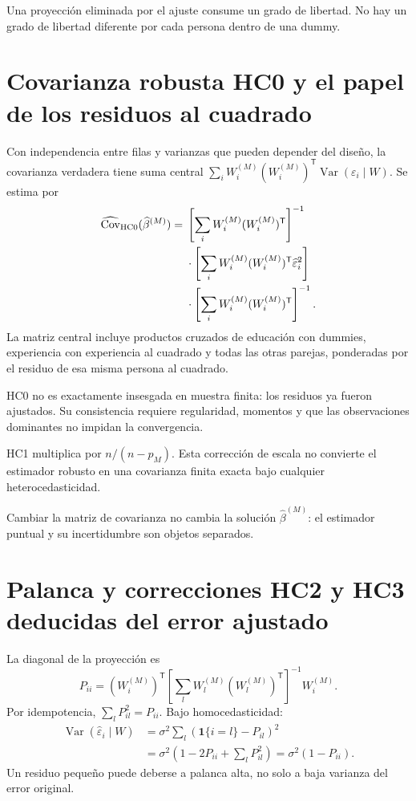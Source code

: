 \documentclass[11pt,a4paper]{article}
\DeclareMathOperator{\Var}{Var}
\DeclareMathOperator{\Cov}{Cov}
\begin{document}
Una proyección eliminada por el ajuste consume un grado de libertad. No hay un grado de libertad diferente por cada persona dentro de una dummy.

\clearpage
\section{Covarianza robusta HC0 y el papel de los residuos al cuadrado}

Con independencia entre filas y varianzas que pueden depender del diseño, la covarianza verdadera tiene suma central
$\sum_iW_i^{(M)}(W_i^{(M)})^{\mathsf T}\Var(\varepsilon_i\mid W)$.
Se estima por
\[
\begin{aligned}
\widehat{\Cov}_{\rm HC0}(\widehat\beta^{(M)})
={}&
\left[\sum_iW_i^{(M)}(W_i^{(M)})^{\mathsf T}\right]^{-1}\\
&\cdot\left[\sum_iW_i^{(M)}(W_i^{(M)})^{\mathsf T}
\widehat\varepsilon_i^2\right]\\
&\cdot\left[\sum_iW_i^{(M)}(W_i^{(M)})^{\mathsf T}\right]^{-1}.
\end{aligned}
\]
La matriz central incluye productos cruzados de educación con dummies, experiencia con experiencia al cuadrado y todas las otras parejas, ponderadas por el residuo de esa misma persona al cuadrado.

HC0 no es exactamente insesgada en muestra finita: los residuos ya fueron ajustados. Su consistencia requiere regularidad, momentos y que las observaciones dominantes no impidan la convergencia.

HC1 multiplica por $n/(n-p_M)$. Esta corrección de escala no convierte el estimador robusto en una covarianza finita exacta bajo cualquier heterocedasticidad.

Cambiar la matriz de covarianza no cambia la solución $\widehat\beta^{(M)}$: el estimador puntual y su incertidumbre son objetos separados.

\clearpage
\section{Palanca y correcciones HC2 y HC3 deducidas del error ajustado}

La diagonal de la proyección es
\[
P_{ii}=(W_i^{(M)})^{\mathsf T}
\left[\sum_lW_l^{(M)}(W_l^{(M)})^{\mathsf T}\right]^{-1}W_i^{(M)}.
\]
Por idempotencia, $\sum_lP_{il}^2=P_{ii}$. Bajo homocedasticidad:
\[
\begin{aligned}
\Var(\widehat\varepsilon_i\mid W)
&=\sigma^2\sum_l(\mathbf1\{i=l\}-P_{il})^2\\
&=\sigma^2(1-2P_{ii}+\sum_lP_{il}^2)
=\sigma^2(1-P_{ii}).
\end{aligned}
\]
Un residuo pequeño puede deberse a palanca alta, no solo a baja varianza del error original.
\end{document}
